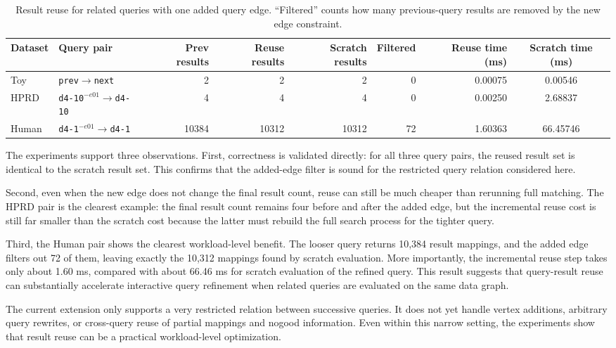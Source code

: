\begin{table}[t]
  \caption{Result reuse for related queries with one added query edge. ``Filtered'' counts how many previous-query results are removed by the new edge constraint.}
  \label{tab:result-reuse}
  \centering
  \scriptsize
  \setlength{\tabcolsep}{3pt}
  \begin{tabular}{llrrrrrc}
    \toprule
    Dataset & Query pair & Prev results & Reuse results & Scratch results & Filtered & Reuse time (ms) & Scratch time (ms) \\
    \midrule
    Toy & \texttt{prev$\to$next} & 2 & 2 & 2 & 0 & 0.00075 & 0.00546 \\
    HPRD & \texttt{d4-10$^{-e01}\to$d4-10} & 4 & 4 & 4 & 0 & 0.00250 & 2.68837 \\
    Human & \texttt{d4-1$^{-e01}\to$d4-1} & 10384 & 10312 & 10312 & 72 & 1.60363 & 66.45746 \\
    \bottomrule
  \end{tabular}
\end{table}

The experiments support three observations. First, correctness is validated directly: for all three query pairs, the reused result set is identical to the scratch result set. This confirms that the added-edge filter is sound for the restricted query relation considered here.

Second, even when the new edge does not change the final result count, reuse can still be much cheaper than rerunning full matching. The HPRD pair is the clearest example: the final result count remains four before and after the added edge, but the incremental reuse cost is still far smaller than the scratch cost because the latter must rebuild the full search process for the tighter query.

Third, the Human pair shows the clearest workload-level benefit. The looser query returns 10,384 result mappings, and the added edge filters out 72 of them, leaving exactly the 10,312 mappings found by scratch evaluation. More importantly, the incremental reuse step takes only about 1.60 ms, compared with about 66.46 ms for scratch evaluation of the refined query. This result suggests that query-result reuse can substantially accelerate interactive query refinement when related queries are evaluated on the same data graph.

The current extension only supports a very restricted relation between successive queries. It does not yet handle vertex additions, arbitrary query rewrites, or cross-query reuse of partial mappings and nogood information. Even within this narrow setting, the experiments show that result reuse can be a practical workload-level optimization.
